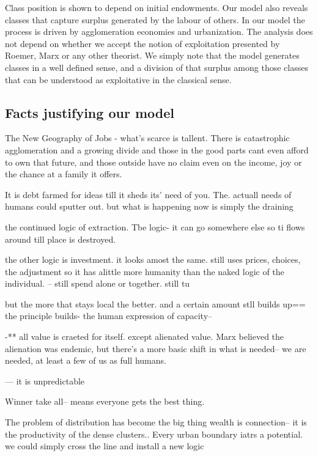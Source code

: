 Class position is shown to depend on initial endowments. 
Our model also reveals classes that capture surplus generated by the labour of others. In our model the process is driven by agglomeration economies and urbanization. The analysis does not depend on whether we accept the notion of exploitation presented by Roemer, Marx or any other theorist. We simply note that the model generates classes in a well defined sense, and a division of that surplus among those classes that can be understood  as exploitative in the  classical sense. 







\subsection{Facts justifying our model}

The New Geography of Jobs - what's scarce is tallent. There is catastrophic agglomeration and a growing divide
and those in the good parts cant even afford to own that future, and those outside have no claim even on the income, joy or the chance at a family it offers.

It is debt farmed for ideas till it sheds its' need of you. 
The. actuall needs of humans could sputter out. but what is happening now is simply the draining

the continued logic of extraction.
Tbe logic- it can go somewhere else so ti flows around till place is destroyed. 

the other logic is investment. it looks amost the same. still uses prices, choices, the adjustment so it has alittle more humanity than the naked logic of the individual. -- still spend alone or together. still tu

but the more that stays local the better. and a certain amount stll builds up== the principle builds- the human expression of capacity--

-** all value is craeted for itself. except alienated value. Marx believed the alienation was endemic, but there's a more basic shift in what is needed-- we are needed, at least a few of us as full humans.

--- it is unpredictable

Winner take all-- means everyone gets the best thing. 

The problem of distribution has become the big thing
wealth is connection-- it is the productivity of the dense clusters.. 
Every urban boundary iatrs a potential. we could simply cross the line and install a new logic

